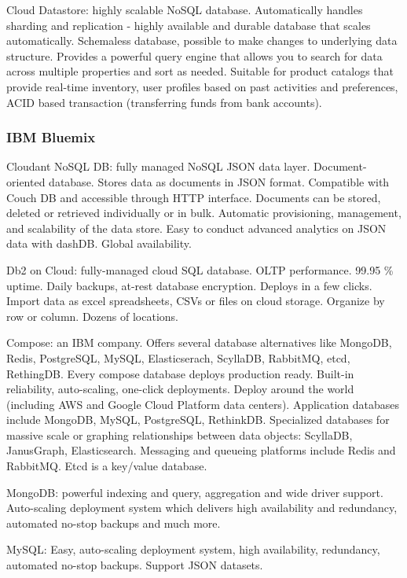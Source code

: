 Cloud Datastore: highly scalable NoSQL database. Automatically handles sharding and replication - highly available and durable database that scales automatically. Schemaless database, possible to make changes to underlying data structure. Provides a powerful query engine that allows you to search for data across multiple properties and sort as needed. Suitable for product catalogs that provide real-time inventory, user profiles based on past activities and preferences, ACID based transaction (transferring funds from bank accounts).


\subsubsection{IBM Bluemix}
Cloudant NoSQL DB: fully managed NoSQL JSON data layer. Document-oriented database. Stores data as documents in JSON format. Compatible with Couch DB and accessible through HTTP interface. Documents can be stored, deleted or retrieved individually or in bulk. Automatic provisioning, management, and scalability of the data store. Easy to conduct advanced analytics on JSON data with dashDB. Global availability. 

Db2 on Cloud: fully-managed cloud SQL database. OLTP performance. 99.95 \% uptime. Daily backups, at-rest database encryption. Deploys in a few clicks. Import data as excel spreadsheets, CSVs or files on cloud storage. Organize by row or column. Dozens of locations.  

Compose: an IBM company. Offers several database alternatives like MongoDB, Redis, PostgreSQL, MySQL, Elasticserach, ScyllaDB, RabbitMQ, etcd, RethingDB. Every compose database deploys production ready. Built-in reliability, auto-scaling, one-click deployments. Deploy around the world (including AWS and Google Cloud Platform data centers). Application databases include MongoDB, MySQL, PostgreSQL, RethinkDB. Specialized databases for massive scale or graphing relationships between data objects: ScyllaDB, JanusGraph, Elasticsearch. Messaging and queueing platforms include Redis and RabbitMQ. Etcd is a key/value database. 

MongoDB: powerful indexing and query, aggregation and wide driver support. Auto-scaling deployment system which delivers high availability and redundancy, automated no-stop backups and much more. 

MySQL: Easy, auto-scaling deployment system, high availability, redundancy, automated no-stop backups. Support JSON datasets. 

